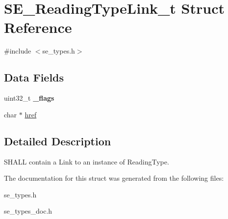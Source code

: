 \hypertarget{structSE__ReadingTypeLink__t}{}\section{S\+E\+\_\+\+Reading\+Type\+Link\+\_\+t Struct Reference}
\label{structSE__ReadingTypeLink__t}


{\ttfamily \#include $<$se\+\_\+types.\+h$>$}

\subsection*{Data Fields}
\begin{DoxyCompactItemize}
\item 
uint32\+\_\+t {\bfseries \+\_\+flags}
\item 
char $\ast$ \hyperlink{group__ReadingTypeLink_gadbfb1fd5eb21fc308fdf525851fe402c}{href}
\end{DoxyCompactItemize}


\subsection{Detailed Description}
S\+H\+A\+LL contain a Link to an instance of Reading\+Type. 

The documentation for this struct was generated from the following files\+:\begin{DoxyCompactItemize}
\item 
se\+\_\+types.\+h\item 
se\+\_\+types\+\_\+doc.\+h\end{DoxyCompactItemize}
